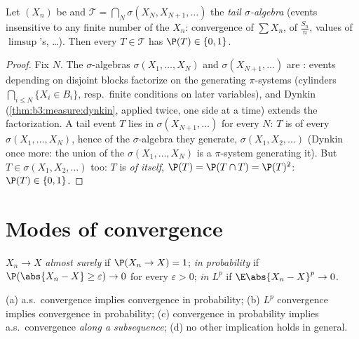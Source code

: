 \begin{theorem}
\label{thm:b3:probability:zeroone}
Let $(X_n)$ be  and $\mathcal T =
\bigcap_N\sigma(X_N, X_{N+1}, \dots)$ the \emph{tail
$\sigma$-algebra} (events
insensitive to any finite number of the $X_n$: convergence of
$\sum X_n$, of $\frac{S_n}n$, values of $\limsup$'s, \dots).
Then every $T \in \mathcal T$ has $\P(T) \in \{0,
1\}$.
\end{theorem}

\begin{proof}
Fix $N$. The $\sigma$-algebras $\sigma(X_1, \dots, X_N)$ and
$\sigma(X_{N+1}, \dots)$ are : events depending on
disjoint blocks factorize on the generating $\pi$-systems
(cylinders $\bigcap_{i\leq N}\{X_i \in B_i\}$, resp.\ finite
conditions on later variables), and Dynkin
(\cref{thm:b3:measure:dynkin}, applied twice, one side at a
time) extends the factorization. A tail event $T$ lies in
$\sigma(X_{N+1}, \dots)$ for every $N$: $T$ is  of
every $\sigma(X_1, \dots, X_N)$, hence of the $\sigma$-algebra
they generate, $\sigma(X_1, X_2, \dots)$ (Dynkin once more:
the union of the $\sigma(X_1,\dots,X_N)$ is a $\pi$-system
generating it). But $T \in \sigma(X_1, X_2, \dots)$ too: $T$
is  \emph{of itself}, $\P(T) = \P(T\cap T) =
\P(T)^2$: $\P(T) \in \{0, 1\}$.
\end{proof}

\section{Modes of convergence}

\begin{definition}\label{def:b3:probability:modes}
$X_n \to X$ \emph{almost surely} if $\P(X_n \to X) = 1$;
\emph{in probability} if $\P(\abs{X_n - X} \geq \varepsilon)
\to 0$ for every $\varepsilon > 0$; \emph{in $L^p$} if
$\E\abs{X_n - X}^p \to 0$.
\end{definition}

\begin{proposition}\label{prop:b3:probability:modes}
(a) a.s.\ convergence implies convergence in probability;
(b) $L^p$ convergence implies convergence in probability;
(c) convergence in probability implies a.s.\ convergence
\emph{along a subsequence};
(d) no other implication holds in general.
\end{proposition}

